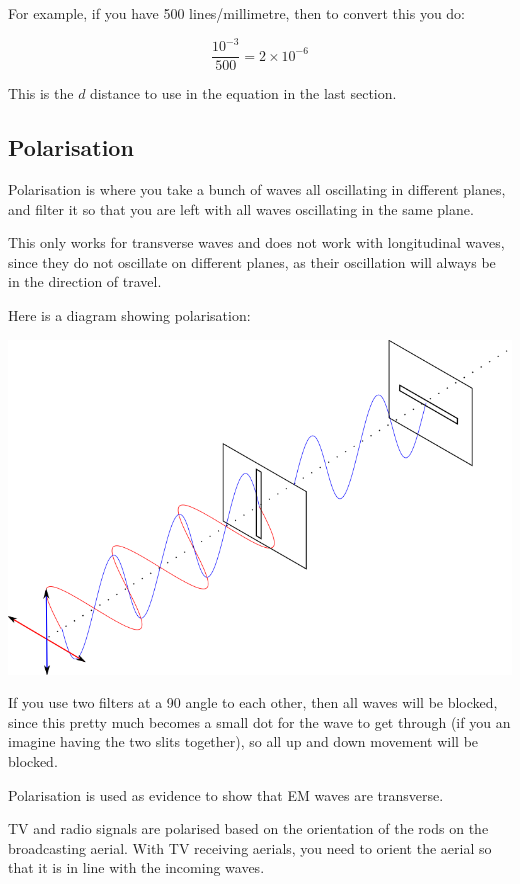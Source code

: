 \documentclass[a4paper, 12pt]{article}
\begin{document}
For example, if you have 500 lines/millimetre, then to convert this you do:

$$
\frac{10^{-3}}{500} = 2 \times 10^{-6}
$$

This is the $d$ distance to use in the equation in the last section.

\subsection{Polarisation}

Polarisation is where you take a bunch of waves all oscillating in different planes, and filter it so that you are left with all waves oscillating in the same plane.

This only works for transverse waves and does not work with longitudinal waves, since they do not oscillate on different planes, as their oscillation will always be in the direction of travel.

Here is a diagram showing polarisation:

\includegraphics[width=\textwidth]{images/polarisation.png}

If you use two filters at a 90{\textdegree} angle to each other, then all waves will be blocked, since this pretty much becomes a small dot for the wave to get through (if you an imagine having the two slits together), so all up and down movement will be blocked.

Polarisation is used as evidence to show that EM waves are transverse.

TV and radio signals are polarised based on the orientation of the rods on the broadcasting aerial. With TV receiving aerials, you need to orient the aerial so that it is in line with the incoming waves.
\end{document}
